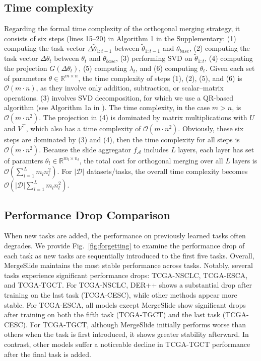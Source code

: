 \documentclass[10pt,twocolumn,letterpaper]{article}
\begin{document}
{\subsection{Time complexity} Regarding the formal time complexity of the orthogonal merging strategy, it consists of six steps (lines 15–20) in Algorithm 1 in the Supplementary: (1) computing the task vector $\Delta \tilde{\theta}_{1:t-1}$ between $\tilde{\theta}_{1:t-1}$ and $\theta_{base}$, (2) computing the task vector $\Delta \theta_t$ between $\theta_t$ and $\theta_{base}$, (3) performing SVD on $\tilde{\theta}_{1:t}$, (4) computing the projection $G(\Delta \theta_t)$, (5) computing $\lambda_t$, and (6) computing $\theta_t$. Given each set of parameters $\theta \in \mathbb{R}^{m \times n}$, the time complexity of steps (1), (2), (5), and (6) is $\mathcal{O}(m \cdot n)$, as they involve only addition, subtraction, or scalar–matrix operations. (3) involves SVD decomposition, for which we use a QR-based algorithm (see Algorithm 1a in \cite{svd}). The time complexity, in the case $m > n$, is $\mathcal{O}(m \cdot n^2)$. The projection in (4) is dominated by matrix multiplications with $U$ and $V^{\intercal}$, which also has a time complexity of $\mathcal{O}(m \cdot n^2)$. Obviously, these six steps are dominated by (3) and (4), then the time complexity for all steps is $\mathcal{O}(m \cdot n^2)$. Because the slide aggregator $f_{\mathcal{A}}$ includes $L$ layers, each layer has set of paramters $\theta_{l} \in \mathbb{R}^{m_l\times n_l}$, the total cost for orthogonal merging over all $L$ layers is $\mathcal{O}(\sum^{L}_{l=1}m_ln^2_l)$. For $|\mathcal{D}|$ datasets/tasks, the overall time complexity becomes $\mathcal{O}\left(|\mathcal{D}|\sum_{l=1}^{L} m_l n_l^2\right)$.}

\subsection{Performance Drop Comparison} When new tasks are added, the performance on previously learned tasks often degrades. We provide Fig.~\ref{fig:forgetting} to examine the performance drop of each task as new tasks are sequentially introduced to the first five tasks. Overall, MergeSlide maintains the most stable performance across tasks. Notably, several tasks experience significant performance drops: TCGA-NSCLC, TCGA-ESCA, and TCGA-TGCT. For TCGA-NSCLC, DER++ shows a substantial drop after training on the last task (TCGA-CESC), while other methods appear more stable. For TCGA-ESCA, all models except MergeSlide show significant drops after training on both the fifth task (TCGA-TGCT) and the last task (TCGA-CESC). For TCGA-TGCT, although MergeSlide initially performs worse than others when the task is first introduced, it shows greater stability afterward. In contrast, other models suffer a noticeable decline in TCGA-TGCT performance after the final task is added.
\end{document}
